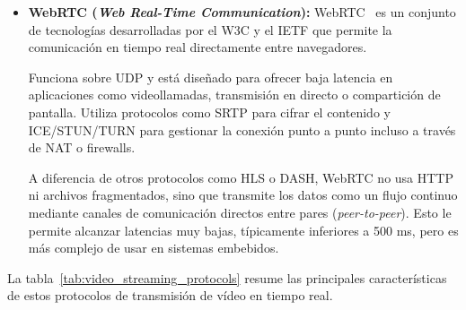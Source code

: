 \begin{itemize}
    \item \textbf{WebRTC (\emph{Web Real-Time Communication}):} WebRTC~\citep{webrtc_w3c} es un conjunto de tecnologías desarrolladas por el W3C y el IETF que permite la comunicación en tiempo real directamente entre navegadores.

    Funciona sobre UDP y está diseñado para ofrecer baja latencia en aplicaciones como videollamadas, transmisión en directo o compartición de pantalla.
    Utiliza protocolos como SRTP para cifrar el contenido y ICE/STUN/TURN para gestionar la conexión punto a punto incluso a través de NAT o firewalls.

    A diferencia de otros protocolos como HLS o DASH, WebRTC no usa HTTP ni archivos fragmentados, sino que transmite los datos como un flujo continuo mediante canales de comunicación directos entre pares (\emph{peer-to-peer}).
    Esto le permite alcanzar latencias muy bajas, típicamente inferiores a 500 ms, pero es más complejo de usar en sistemas embebidos.

\end{itemize}
La tabla~\ref{tab:video_streaming_protocols} resume las principales características de estos protocolos de transmisión de vídeo en tiempo real.

\begin{table}[h]
    \centering
    \footnotesize
    \caption{Comparativa de protocolos de transmisión de vídeo en tiempo real}
    \label{tab:video_streaming_protocols}
\end{table}


